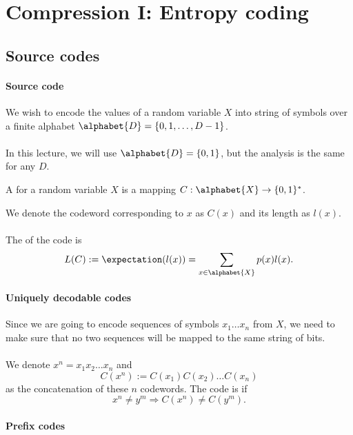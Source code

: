 \documentclass[a4paper, 11pt, openany]{book}
\begin{document}
\section{Compression I: Entropy coding}
\label{sec:35}



\subsection{Source codes}

\paragraph{Source code}

We wish to encode the values of a random variable $X$ into string of symbols over a finite alphabet $\alphabet{D} = \{0,1,\ldots,D-1\}$.\\
~\\
In this lecture, we will use $\alphabet{D} = \{0,1\}$, but the analysis is the same for any $D$.


A  for a random variable $X$ is a mapping $C : \alphabet{X} \to \{0,1\}^*$.

We denote the codeword corresponding to $x$ as $C(x)$ and its length as $l(x)$.\\
~\\
The  of the code is
\[
	L(C) := \expectation( l(x)) = \sum_{x \in \alphabet{X}} p(x) l(x).
\]




\paragraph{Uniquely decodable codes}

Since we are going to encode  sequences of symbols $x_1 \ldots x_n$ from $X$, we need to make sure that no two sequences will be mapped to the same string of bits.\\
~\\
We denote $x^n = x_1 x_2 \ldots x_n$ and
$$
	C(x^n) := C(x_1) C(x_2) \ldots C(x_n)
$$
as the concatenation of these $n$ codewords. The code is  if
\[
	x^n \ne y^m \Rightarrow C(x^n) \ne C(y^m).
\]




\paragraph{Prefix codes}
\end{document}
